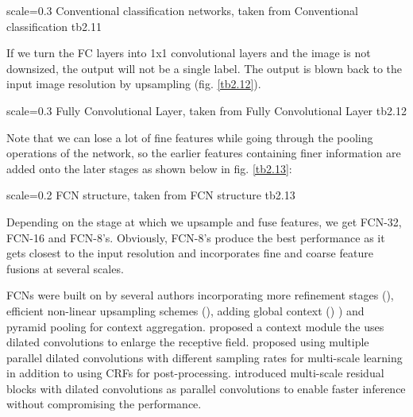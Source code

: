 {scale=0.3}%
{Conventional classification networks, taken from \cite{long2015}}%
{Conventional classification}%
{tb2.11} %

If we turn the FC layers into 1x1 convolutional layers and the image is not downsized, the output will not be a single label. The output is blown back to the input image resolution by upsampling (fig. \ref{tb2.12}). 

{scale=0.3}%
{Fully Convolutional Layer, taken from \cite{long2015}}%
{Fully Convolutional Layer}%
{tb2.12}

Note that we can lose a lot of fine features while going through the pooling operations of the network, so the earlier features containing finer information are added onto the later stages as shown below in fig. \ref{tb2.13}:

{scale=0.2}%
{FCN structure, taken from \cite{long2015}}%
{FCN structure}%
{tb2.13}

Depending on the stage at which we upsample and fuse features, we get FCN-32, FCN-16 and FCN-8's. Obviously, FCN-8's produce the best performance as it gets closest to the input resolution and incorporates fine and coarse feature fusions at several scales. 

FCNs were built on by several authors incorporating more refinement stages (\cite{badrinarayanan2016}), efficient non-linear upsampling  schemes  (\cite{liu2015}),  adding  global  context () \cite{zhao2017})  and pyramid pooling for context aggregation. \cite{yu2016} proposed  a  context  module  the  uses  dilated  convolutions  to enlarge  the  receptive  field.  \cite{chen2017}  proposed  using multiple parallel dilated convolutions with different sampling rates  for  multi-scale  learning  in  addition  to  using  CRFs  for post-processing. \cite{Valada2017} introduced multi-scale residual blocks  with  dilated  convolutions  as  parallel  convolutions  to enable faster inference without compromising the performance.

























